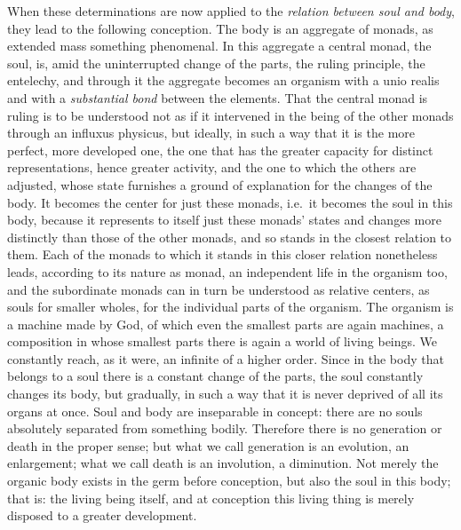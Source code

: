 When these determinations are now applied to the \emph{relation
between soul and body}, they lead to the following conception. The body
is an aggregate of monads, as extended mass something
phenomenal. In this aggregate a central monad, the soul, is,
amid the uninterrupted change of the parts, the ruling principle, the
entelechy, and through it the aggregate becomes an organism with a unio
realis and with a \emph{substantial bond} between the elements. That
the central monad is ruling is to be understood not as if it intervened
in the being of the other monads through an influxus physicus, but
ideally, in such a way that it is the more perfect, more developed one,
the one that has the greater capacity for distinct representations,
hence greater activity, and the one to which the others are adjusted,
whose state furnishes a ground of explanation for the changes of the
body. It becomes the center for just these monads, i.e.\ it becomes the
soul in this body, because it represents to itself just these monads'
states and changes more distinctly than those of the other monads, and
so stands in the closest relation to them. Each of the monads to which
it stands in this closer relation nonetheless leads, according to its
nature as monad, an independent life in the organism too, and the
subordinate monads can in turn be understood as relative centers, as
souls for smaller wholes, for the individual parts of the organism. The
organism is a machine made by God, of which even the smallest parts are
again machines, a composition in whose smallest parts there is again a
world of living beings. We constantly reach, as it were, an infinite of
a higher order. Since in the body that belongs to a soul there is a
constant change of the parts, the soul constantly changes its body, but
gradually, in such a way that it is never deprived of all its organs at
once. Soul and body are inseparable in concept: there are no souls
absolutely separated from something bodily. Therefore there is no
generation or death in the proper sense; but what we call generation is
an evolution, an enlargement; what we call death is an involution, a
diminution. Not merely the organic body exists in the germ before
conception, but also the soul in this body; that is: the living being
itself, and at conception this living thing is merely disposed to a
greater development.



